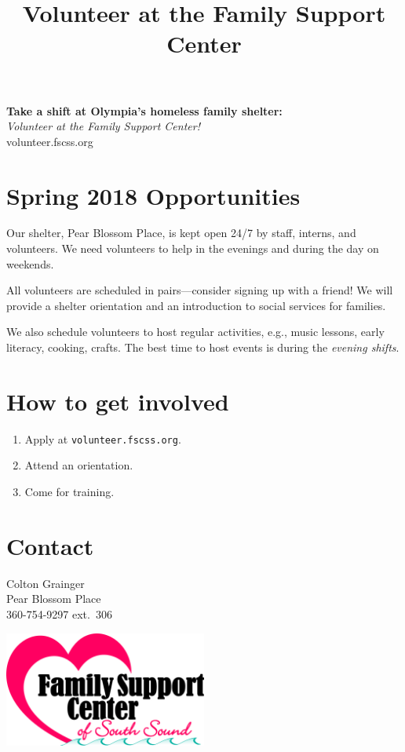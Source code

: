 \documentclass[14pt]{extarticle}
\title{Volunteer at the Family Support Center}
\begin{document}
\pagestyle{empty}
\noindent
{\Huge \bf Take a shift at Olympia's homeless family shelter:}\\
{\LARGE \emph{Volunteer at the Family Support Center!}}\\
{\Huge {} \selectfont volunteer.fscss.org}

\section*{Spring 2018 Opportunities}

\large
Our shelter, Pear Blossom Place, is kept open 24/7 by staff, interns, and volunteers. We need volunteers to help in the evenings and during the day on weekends. 

All volunteers are scheduled in pairs---consider signing up with a friend! We will provide a shelter orientation and an introduction to social services for families.

We also schedule volunteers to host regular activities, e.g., music lessons, early literacy, cooking, crafts. The best time to host events is during the \emph{evening shifts}.

\section*{How to get involved}
\begin{enumerate}[itemsep=0pt]
	\item Apply at {\Large\texttt{volunteer.fscss.org}}.
    \item Attend an orientation. 
    \item Come for training.
\end{enumerate}
\normalsize
\section*{Contact}
Colton Grainger\\
Pear Blossom Place\\
360-754-9297 ext.\ 306

\vspace{-140pt}
\begin{flushright}
\includegraphics[width = 0.5\textwidth]{logo.jpg}
\end{flushright}
\end{document}
